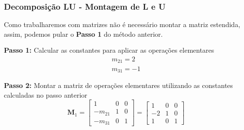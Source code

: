 \documentclass{beamer}
\theoremstyle{mystyle}
\begin{document}
\begin{frame}
	\frametitle{Decomposição LU - Montagem de L e U}
	Como trabalharemos com matrizes não é necessário montar a matriz estendida, assim, podemos pular o \textbf{Passo 1} do método anterior.

	\textbf{Passo 1:} Calcular as \alert{constantes} para aplicar as operações elementares
	\begin{gather*}
		m_{21} = 2\\
		m_{31} = -1
	\end{gather*}

	\textbf{Passo 2:} Montar a matriz de operações elementares utilizando as \alert{constantes} calculadas no passo anterior
	\begin{equation*}
		\mathbf{M}_{1} =
		\left[
		\begin{array}{ccc}
			1 & 0 & 0  \\
			-m_{21} & 1 & 0  \\
			-m_{31} & 0 & 1
		\end{array}
		\right] 
		 =
		\left[
		\begin{array}{ccc}
			1 & 0 & 0  \\
			-2 & 1 & 0  \\
		   1 & 0 & 1
		\end{array}
		\right]
	\end{equation*}
\end{frame}
\end{document}
